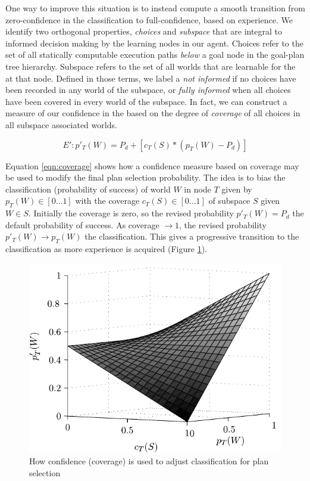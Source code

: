 One way to improve this situation is to instead compute a smooth transition from zero-confidence in the \dt classification to full-confidence, based on experience. We identify two orthogonal properties, \textit{choices} and \textit{subspace} that are integral to informed decision making by the learning nodes in our agent. Choices refer to the set of all statically computable execution paths \textit{below} a goal node in the goal-plan tree hierarchy. Subspace refers to the set of all worlds that are learnable for the \dt at that node. Defined in those terms, we label a \dt \textit{not informed} if no choices have been recorded in any world of the subspace, or \textit{fully informed} when all choices have been covered in every world of the subspace. In fact, we can construct a measure of our confidence in the \dt based on the degree of \textit{coverage} of all choices in all subspace associated worlds.

\begin{equation}
\label{eqn:coverage}   
E': p'_T(W)= P_d + \left[  c_T(S) *  \left( p_T(W) - P_d \right)  \right]
\end{equation}

Equation \ref{eqn:coverage} shows how a confidence measure based on coverage may be used to modify the final plan selection probability. The idea is to bias the \dt classification (probability of success) of world $W$ in node $T$ given by $p_T(W) \in [0 \ldots 1]$ with the coverage $c_T(S) \in [0 \ldots 1]$ of subspace $S$ given $W \in S$. Initially the coverage is zero, so the revised probability $p'_T(W) = P_d$ the default probability of success. As coverage $\rightarrow 1$, the revised probability $p'_T(W) \rightarrow p_T(W)$ the \dt classification. This gives a progressive transition to the \dt classification as more experience is acquired (Figure \ref{fig:coverage-surface}).

\begin{figure}[ht]
   \centering
   \includegraphics[width=\columnwidth]{figs/coverage-surface}
   \caption{How confidence (coverage) is used to adjust \dt classification for plan selection}
   \label{fig:coverage-surface}
\end{figure}


